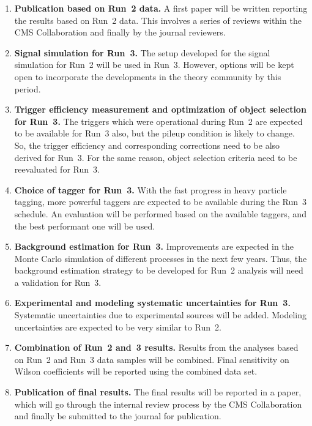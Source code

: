 \documentclass[a4paper,11pt]{article}
\begin{document}
\begin{enumerate}[noitemsep,topsep=0pt]
\item {\bf Publication based on Run~2 data.} A first paper will be written reporting the results based on Run~2 data. This involves a series of reviews within the CMS Collaboration and finally by the journal reviewers. 

\item {\bf Signal simulation for Run~3.} The setup developed for the signal simulation for Run~2 will be used in Run~3. However, options will be kept open to incorporate the developments in the theory community by this period. 

\item {\bf Trigger efficiency measurement and optimization of object selection for Run~3.} The triggers which were operational during Run~2 are expected to be available for Run~3 also, but the pileup condition is likely to change. So, the trigger efficiency and corresponding corrections need to be also derived for Run~3. 
For the same reason, object selection criteria need to be reevaluated for Run~3. 

\item {\bf Choice of \PH tagger for Run~3.} With the fast progress in heavy particle tagging, more powerful taggers are expected to be available during the Run~3 schedule. An evaluation will be performed based on the available taggers, and the best performant one will be used. 

\item {\bf Background estimation for Run~3.} Improvements are expected in the Monte Carlo simulation of different processes in the next few years. Thus, the background estimation strategy to be developed for Run~2 analysis will need a validation for Run~3.

\item {\bf Experimental and modeling systematic uncertainties for Run~3.} Systematic uncertainties due to experimental sources will be added. Modeling uncertainties are expected to be very similar to Run~2.

\item {\bf Combination of Run~2 and~3 results.} Results from the analyses based on Run~2 and Run~3 data samples will be combined. Final sensitivity on Wilson coefficients will be reported using the combined data set. 

\item {\bf Publication of final results.} The final results will be reported in a paper, which will go through the internal review process by the CMS Collaboration and finally be submitted to the journal for publication. 

\end{enumerate}
\end{document}
